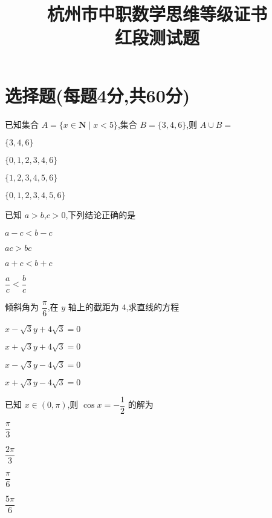\documentclass{exam-zh}
\begin{document}
 

\title{杭州市中职数学思维等级证书\\红段测试题}
\maketitle


\section{选择题(每题4分,共60分)}

\begin{question}
     已知集合 $A = \{x \in \mathbf{N} \mid x < 5\}$,集合 $B = \{3,4,6\}$,则 $A \cup B =$ \paren[A]
    \begin{choices}
        \item $\{3,4,6\}$ 
        \item $\{0,1,2,3,4,6\}$ 
        \item $\{1,2,3,4,5,6\}$ 
        \item $\{0,1,2,3,4,5,6\}$
    \end{choices}
\end{question}

\begin{question}
    已知 $a > b$,$c > 0$,下列结论正确的是 \paren[B]
    \begin{choices}
        \item $a - c < b - c$
        \item $ac > bc$
        \item $a + c < b + c$
        \item $\dfrac{a}{c} < \dfrac{b}{c}$
    \end{choices}
\end{question}
\begin{question}
    倾斜角为 $\dfrac{\pi}{6}$,在 $y$ 轴上的截距为 $4$,求直线的方程 \paren[A]
    \begin{choices}
        \item $x - \sqrt{3}y + 4\sqrt{3} = 0$
        \item $x + \sqrt{3}y + 4\sqrt{3} = 0$
        \item $x - \sqrt{3}y - 4\sqrt{3} = 0$
        \item $x + \sqrt{3}y - 4\sqrt{3} = 0$
    \end{choices}
\end{question}

\begin{question}
    已知 $x \in (0,\pi)$,则 $\cos x = -\dfrac{1}{2}$ 的解为 \paren[B]
    \begin{choices}
        \item $\dfrac{\pi}{3}$
        \item $\dfrac{2\pi}{3}$
        \item $\dfrac{\pi}{6}$
        \item $\dfrac{5\pi}{6}$
    \end{choices}
\end{question}
\end{document}
